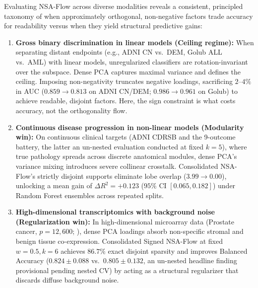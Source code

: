 \documentclass[11pt]{article}
\theoremstyle{definition}
\begin{document}
Evaluating NSA-Flow across diverse modalities reveals a consistent, principled taxonomy of when approximately orthogonal, non-negative factors trade accuracy for readability versus when they yield structural predictive gains:

\begin{enumerate}\itemsep2pt
  \item \textbf{Gross binary discrimination in linear models (Ceiling regime):} When separating distant endpoints (e.g., ADNI CN vs.\ DEM, Golub ALL vs.\ AML) with linear models, unregularized classifiers are rotation-invariant over the subspace. Dense PCA captures maximal variance and defines the ceiling. Imposing non-negativity truncates negative loadings, sacrificing $2$--$4\%$ in AUC ($0.859 \to 0.813$ on ADNI CN/DEM; $0.986 \to 0.961$ on Golub) to achieve readable, disjoint factors. Here, the sign constraint is what costs accuracy, not the orthogonality flow.
  \item \textbf{Continuous disease progression in non-linear models (Modularity win):} On continuous clinical targets (ADNI CDRSB and the 9-outcome battery, the latter an un-nested evaluation conducted at fixed $k=5$), where true pathology spreads across discrete anatomical modules, dense PCA's variance mixing introduces severe collinear crosstalk. Consolidated NSA-Flow's strictly disjoint supports eliminate lobe overlap ($3.99 \to 0.00$), unlocking a mean gain of $\Delta R^2 = +0.123$ ($95\%$ CI $[0.065, 0.182]$) under Random Forest ensembles across repeated splits.
  \item \textbf{High-dimensional transcriptomics with background noise (Regularization win):} In high-dimensional microarray data (Prostate cancer, $p=12{,}600$; \citealt{singh2002gene}), dense PCA loadings absorb non-specific stromal and benign tissue co-expression. Consolidated Signed NSA-Flow at fixed $w=0.5, k=6$ achieves $86.7\%$ exact disjoint sparsity and improves Balanced Accuracy ($0.824 \pm 0.088$ vs.\ $0.805 \pm 0.132$, an un-nested headline finding provisional pending nested CV) by acting as a structural regularizer that discards diffuse background noise.

\end{enumerate}
\end{document}
